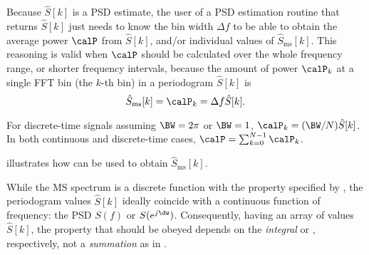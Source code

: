 
Because $\hat S[k]$ is a PSD estimate, the user of a PSD estimation routine that returns $\hat S[k]$ just needs to know the bin width $\Delta f$ to be able to obtain the average power $\calP$ from $\hat S[k]$, and/or individual values of $\hat S_{\textrm{ms}}[k]$.
This reasoning is valid when $\calP$ should be calculated over the whole frequency range, or shorter frequency intervals, because the amount of power $\calP_k$ at a single FFT bin (the $k$-th bin) in a periodogram $\hat S[k]$ is
\begin{equation}
\hat S_{\textrm{ms}}[k] = \calP_k = \Delta f \hat S[k].
\label{eq:powerPerTone}
\end{equation}

For discrete-time signals assuming $\BW = 2 \pi$ or $\BW=1$, $\calP_k = (\BW/N) \hat S[k]$. In both continuous and discrete-time cases, $\calP = \sum_{k=0}^{N-1} \calP_k$.

 illustrates how  can be used to obtain $\hat S_{\textrm{ms}}[k]$.




While the MS spectrum is a discrete function with the property specified by , the periodogram values $\hat S[k]$ ideally coincide with a continuous function of frequency: the PSD $S(f)$ or $S(e^{j \dw})$. Consequently, having an array of values $\hat S[k]$, the property that should be obeyed depends on the \emph{integral}  or , respectively, not a \emph{summation} as in . 

